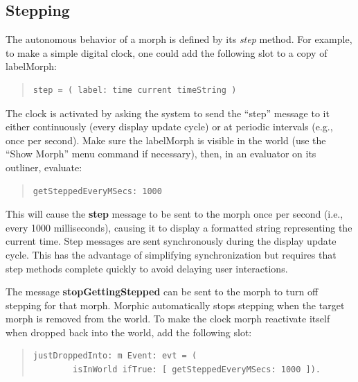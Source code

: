 \documentclass[letterpaper,10pt,english]{sphinxmanual}
\begin{document}
\subsection{Stepping}
\label{morphic:stepping}
The autonomous behavior of a morph is defined by its \emph{step} method. For example, to make a simple digital clock, one could add the following slot to a copy of labelMorph:
\begin{quote}

\begin{Verbatim}[commandchars=\\\{\}]
step = ( label: time current timeString )
\end{Verbatim}
\end{quote}

The clock is activated by asking the system to send the ``step'' message to it either continuously (every display update cycle) or at periodic intervals (e.g., once per second). Make sure the labelMorph is visible in the world (use the ``Show Morph'' menu command if necessary), then, in an evaluator on its outliner, evaluate:
\begin{quote}

\begin{Verbatim}[commandchars=\\\{\}]
getSteppedEveryMSecs: 1000
\end{Verbatim}
\end{quote}

This will cause the \textbf{step} message to be sent to the morph once per second (i.e., every 1000 milliseconds), causing it to display a formatted string representing the current time. Step messages are sent synchronously during the display update cycle. This has the advantage of simplifying synchronization but requires that step methods complete quickly to avoid delaying user interactions.

The message \textbf{stopGettingStepped} can be sent to the morph to turn off stepping for that morph. Morphic automatically stops stepping when the target morph is removed from the world. To make the clock morph reactivate itself when dropped back into the world, add the following slot:
\begin{quote}

\begin{Verbatim}[commandchars=\\\{\}]
justDroppedInto: m Event: evt = (
        isInWorld ifTrue: [ getSteppedEveryMSecs: 1000 ]).
\end{Verbatim}
\end{quote}
\end{document}
